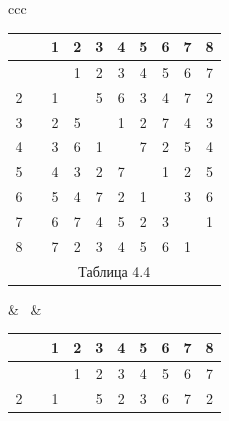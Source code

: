 \begin{center}





\begin{tabular}{ccc}





\begin{tabular}{cccccccccc}


\ & \vline & 1 & 2 & 3 & 4 & 5 & 6 & 7 & 8 \\


\hline


 1 & \vline & \ & 1 & 2 & 3 & 4 & 5 & 6 & 7 \\


2 & \vline & 1 & \ & 5 & 6 & 3 & 4 & 7 & 2 \\


3 & \vline & 2 & 5 & \ & 1 & 2 & 7 & 4 & 3 \\


4 & \vline & 3 & 6 & 1 & \ & 7 & 2 & 5 & 4 \\


5 & \vline & 4 & 3 & 2 & 7 & \ & 1 & 2 & 5 \\


6 & \vline & 5 & 4 & 7 & 2 & 1 & \ & 3 & 6 \\


7 & \vline & 6 & 7 & 4 & 5 & 2 & 3 & \ & 1 \\


8 & \vline & 7 & 2 & 3 & 4 & 5 & 6 & 1 & \ \\


\multicolumn{10}{c}{ Таблица 4.4}


\end{tabular}





& \ & 





\begin{tabular}{cccccccccc}


\ & \vline & 1 & 2 & 3 & 4 & 5 & 6 & 7 & 8 \\


\hline


 1 & \vline & \ & 1 & 2 & 3 & 4 & 5 & 6 & 7 \\


2 & \vline & 1 & \ & 5 & 2 & 3 & 6 & 7 & 2 \\



\end{tabular}
\end{tabular}
\end{center}
